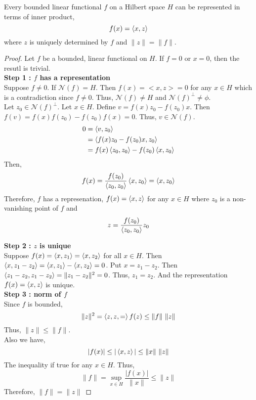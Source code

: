 \begin{theorem}[Riesz]
	Every bounded linear functional $f$ on a Hilbert space $H$ can be represented in terms of inner product,
	\[ f(x) = \left\langle x,z \right\rangle \]
	where $z$ is uniquely determined by $f$ and $\|z\| = \|f\|$.
\end{theorem}
\begin{proof}
	Let $f$ be a bounded, linear functional on $H$.
	If $f = 0$ or $x = 0$, then the resutl is trivial.\\

	\textbf{Step 1 : $f$ has a representation}\\
	Suppose $f \ne 0$.
	If $\mathcal{N}(f) = H$.
	Then $f(x) = <x,z> = 0$ for any $x \in H$ which is a contradiction since $f \ne 0$.
	Thus, $\mathcal{N}(f) \ne H$ and $\mathcal{N}(f)^\perp \ne \phi$.\\

	Let $z_0 \in \mathcal{N}(f)^\perp$.
	Let $x \in H$.
	Define $v = f(x)z_0 - f(z_0)x$.
	Then $f(v) = f(x)f(z_0) - f(z_0)f(x) = 0$.
	Thus, $v \in \mathcal{N}(f)$.\\

	\begin{align*}
		0
		& = \left\langle v,z_0 \right\rangle \\
		& = \left\langle f(x)z_0-f(z_0)x,z_0 \right\rangle \\
		& = f(x)\left\langle z_0,z_0 \right\rangle - f(z_0)\left\langle x,z_0 \right\rangle 
	\end{align*}
	Then,
	\[ f(x) = \frac{f(z_0)}{\left\langle z_0,z_0 \right\rangle} \left\langle x,z_0 \right\rangle = \left\langle x,z_0 \right\rangle \]
	Therefore, $f$ has a represenation, $f(x) = \left\langle x,z \right\rangle$ for any $x \in H$ where $z_0$ is a non-vanishing point of $f$ and
	\[ z = \frac{f(z_0)}{\left\langle z_0,z_0 \right\rangle} z_0 \]

	\textbf{Step 2 : $z$ is unique}\\
	Suppose $f(x) = \left\langle x,z_1 \right\rangle = \left\langle x,z_2 \right\rangle$ for all $x \in H$.
	Then $\left\langle x,z_1-z_2 \right\rangle = \left\langle x,z_1 \right\rangle - \left\langle x,z_2 \right\rangle = 0$.
	Put $x = z_1 - z_2$.
	Then $\left\langle z_1-z_2,z_1-z_2 \right\rangle = \|z_1-z_2\|^2 = 0$.
	Thus, $z_1=z_2$.
	And the representation $f(x) = \left\langle x,z \right\rangle$ is unique.\\

	\textbf{Step 3 : norm of $f$}\\
	Since $f$ is bounded,
	\[ \|z\|^2 = \left\langle z,z,= \right\rangle f(z) \le \|f\| \ \|z\| \]
	Thus, $\|z\| \le \|f\|$.\\

	Also we have,
	\[ |f(x)| \le |\left\langle x,z \right\rangle| \le \|x\| \ \|z\| \]
	The inequality if true for any $x \in H$.
	Thus,
	\[ \|f\| = \sup_{x \in H} \frac{|f(x)|}{\|x\|} \le \|z\| \]
	Therefore, $\|f\| = \|z\|$
\end{proof}

